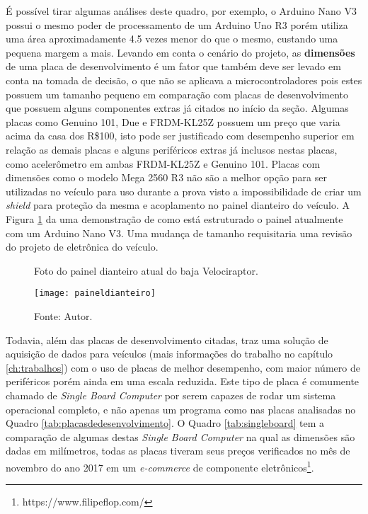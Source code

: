É possível tirar algumas análises deste quadro, por exemplo, o Arduino Nano V3 possui o mesmo poder de processamento de um Arduino Uno R3 porém utiliza uma área aproximadamente 4.5 vezes menor do que o mesmo, custando uma pequena margem a mais. Levando em conta o cenário do projeto, as \textbf{dimensões} de uma placa de desenvolvimento é um fator que também deve ser levado em conta na tomada de decisão, o que não se aplicava a microcontroladores pois estes possuem um tamanho pequeno em comparação com placas de desenvolvimento que possuem alguns componentes extras já citados no início da seção. Algumas placas como Genuino 101, Due e FRDM-KL25Z possuem um preço que varia acima da casa dos R\$100, isto pode ser justificado com desempenho superior em relação as demais placas e alguns periféricos extras já inclusos nestas placas, como acelerômetro em ambas FRDM-KL25Z e Genuino 101. Placas com dimensões como o modelo Mega 2560 R3 não são a melhor opção para ser utilizadas no veículo para uso durante a prova visto a impossibilidade de criar um \textit{shield} para proteção da mesma e acoplamento no painel dianteiro do veículo. A Figura \ref{fig:paineldianteiro} da uma demonstração de como está estruturado o painel atualmente com um Arduino Nano V3. Uma mudança de tamanho requisitaria uma revisão do projeto de eletrônica do veículo.

\begin{figure}[!htb]
	\centering
		\caption{Foto do painel dianteiro atual do baja Velociraptor.}
		\texttt{[image: paineldianteiro]} 
		\caption*{Fonte: Autor.}
		\label{fig:paineldianteiro}
\end{figure} 
     

Todavia, além das placas de desenvolvimento citadas,  traz uma solução de aquisição de dados para veículos (mais informações do trabalho no capítulo \ref{ch:trabalhos}) com o uso de placas de melhor desempenho, com maior número de periféricos porém ainda em uma escala reduzida. Este tipo de placa é comumente chamado de \textit{Single Board Computer} por serem capazes de rodar um sistema operacional completo, e não apenas um programa como nas placas analisadas no Quadro \ref{tab:placasdedesenvolvimento}. O Quadro \ref{tab:singleboard} tem a comparação de algumas destas \textit{Single Board Computer} na qual as dimensões são dadas em milímetros, todas as placas tiveram seus preços verificados no mês de novembro do ano 2017 em um \textit{e-commerce} de componente eletrônicos\footnote{https://www.filipeflop.com/}.

